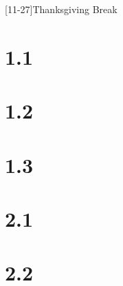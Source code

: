 \documentclass{schedule}
\begin{document}
\maketitle
\begin{schedule}
	[11-27]{Thanksgiving Break}

	\syllabus
	\section{1.1}
	\section{1.2}
	\section[2]{1.3}
	\examreview
	\exam
	\section{2.1}
	\section{2.2}
	\finalreview
	\finalsweek[12-14][5]
	\winterbreak
\end{schedule}
\end{document}
